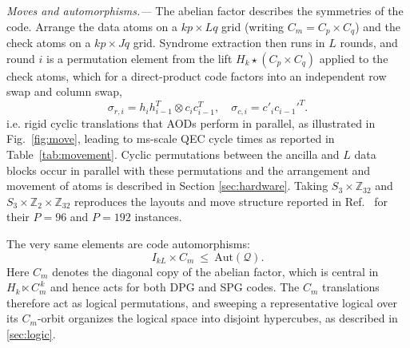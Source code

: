 \documentclass[amsmath,amssymb,twocolumn,aps,prl,superscriptaddress,nofootinbib]{revtex4-2}
\newcommand{\Aut}{\mathrm{Aut}}
\newcommand{\Z}{\mathbb{Z}}
\newcommand{\lead}[1]{\textit{#1.---}}
\theoremstyle{definition}
\begin{document}
\lead{Moves and automorphisms} The abelian factor describes the symmetries of the code. Arrange the data atoms on a $kp\times Lq$ grid (writing $C_m=C_p\times C_q$) and the check atoms on a $kp\times Jq$ grid. Syndrome extraction then runs in $L$ rounds, and round $i$ is a permutation element from the lift $H_k\star (C_p\times C_q)$ applied to the check atoms, which for a direct-product code factors into an independent row swap and column swap,
\begin{equation}\label{eq:moves}
        \sigma_{r,i} = h_{i}h_{i-1}^T\otimes c_ic_{i-1}^T,\quad
        \sigma_{c,i} = c'_i{c_{i-1}'}^T.
\end{equation}
i.e. rigid cyclic translations that AODs perform in parallel, as illustrated in Fig.~\ref{fig:move}, leading to ms-scale QEC cycle times as reported in Table~\ref{tab:movement}.  Cyclic permutations between the ancilla and $L$ data blocks occur in parallel with these permutations and the arrangement and movement of atoms is described in Section \ref{sec:hardware}. Taking $S_3\times\Z_{32}$ and $S_3\times\Z_2\times\Z_{32}$ reproduces the layouts and move structure reported in Ref.~\cite{zhao2026ultrahighratequantumerrorcorrection} for their $P=96$ and $P=192$ instances. 

The very same elements are code automorphisms:
\begin{equation}\label{eq:aut}
I_{kL}\times C_m\ \le\ \Aut(\mathcal Q).
\end{equation} Here $C_m$ denotes the diagonal copy of the abelian factor, which is central in $H_k\ltimes C_m^{\,k}$ and hence acts for both DPG and SPG codes. The $C_m$ translations therefore act as logical permutations, and sweeping a representative logical over its $C_m$-orbit organizes the logical space into disjoint hypercubes, as described in \ref{sec:logic}.
\end{document}
